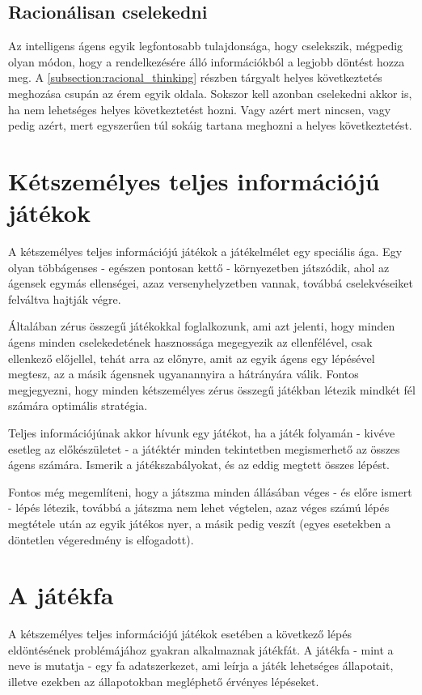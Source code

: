 \subsection{Racionálisan cselekedni}
Az intelligens ágens egyik legfontosabb tulajdonsága, hogy cselekszik, mégpedig olyan módon, hogy a rendelkezésére álló információkból a legjobb döntést hozza meg. A \ref*{subsection:racional_thinking} részben tárgyalt helyes következtetés meghozása csupán az érem egyik oldala. Sokszor kell azonban cselekedni akkor is, ha nem lehetséges helyes következtetést hozni. Vagy azért mert nincsen, vagy pedig azért, mert egyszerűen túl sokáig tartana meghozni a helyes következtetést.

\section{Kétszemélyes teljes információjú játékok}
A kétszemélyes teljes információjú játékok a játékelmélet egy speciális ága. Egy olyan többágenses - egészen pontosan kettő - környezetben játszódik, ahol az ágensek egymás ellenségei, azaz versenyhelyzetben vannak, továbbá cselekvéseiket felváltva hajtják végre.\ujsor

Általában zérus összegű játékokkal foglalkozunk, ami azt jelenti, hogy minden ágens minden cselekedetének hasznossága megegyezik az ellenfélével, csak ellenkező előjellel, tehát arra az előnyre, amit az egyik ágens egy lépésével megtesz, az a másik ágensnek ugyanannyira a hátrányára válik. Fontos megjegyezni, hogy minden kétszemélyes zérus összegű játékban létezik mindkét fél számára optimális stratégia.\ujsor

Teljes információjúnak akkor hívunk egy játékot, ha a játék folyamán - kivéve esetleg az előkészületet - a játéktér minden tekintetben megismerhető az összes ágens számára. Ismerik a játékszabályokat, és az eddig megtett összes lépést.\ujsor

Fontos még megemlíteni, hogy a játszma minden állásában véges - és előre ismert - lépés létezik, továbbá a játszma nem lehet végtelen, azaz véges számú lépés megtétele után az egyik játékos nyer, a másik pedig veszít (egyes esetekben a döntetlen végeredmény is elfogadott).

\section{A játékfa}
A kétszemélyes teljes információjú játékok esetében a következő lépés eldöntésének problémájához gyakran alkalmaznak játékfát. A játékfa - mint a neve is mutatja - egy fa adatszerkezet, ami leírja a játék lehetséges állapotait, illetve ezekben az állapotokban megléphető érvényes lépéseket.\ujsor

